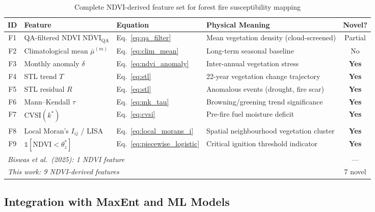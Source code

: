 \documentclass[12pt, a4paper]{article}
\begin{document}
\begin{table}[H]
\centering
\caption{Complete NDVI-derived feature set for forest fire
         susceptibility mapping}
\label{tab:ndvi_features}
\begin{tabular}{@{}clllc@{}}
\toprule
\textbf{ID} & \textbf{Feature} & \textbf{Equation} &
\textbf{Physical Meaning} & \textbf{Novel?} \\
\midrule
F1 & QA-filtered NDVI $\overline{\text{NDVI}}_{\text{QA}}$
   & Eq.~\eqref{eq:qa_filter}
   & Mean vegetation density (cloud-screened)
   & Partial \\
F2 & Climatological mean $\bar{\mu}^{(m)}$
   & Eq.~\eqref{eq:clim_mean}
   & Long-term seasonal baseline
   & No \\
F3 & Monthly anomaly $\delta$
   & Eq.~\eqref{eq:ndvi_anomaly}
   & Inter-annual vegetation stress
   & \textbf{Yes} \\
F4 & STL trend $T$
   & Eq.~\eqref{eq:stl}
   & 22-year vegetation change trajectory
   & \textbf{Yes} \\
F5 & STL residual $R$
   & Eq.~\eqref{eq:stl}
   & Anomalous events (drought, fire scar)
   & \textbf{Yes} \\
F6 & Mann--Kendall $\tau$
   & Eq.~\eqref{eq:mk_tau}
   & Browning/greening trend significance
   & \textbf{Yes} \\
F7 & CVSI$(k^{*})$
   & Eq.~\eqref{eq:cvsi}
   & Pre-fire fuel moisture deficit
   & \textbf{Yes} \\
F8 & Local Moran's $I_{ij}$ / LISA
   & Eq.~\eqref{eq:local_morans_i}
   & Spatial neighbourhood vegetation cluster
   & \textbf{Yes} \\
F9 & $\mathbb{1}[\text{NDVI} < \theta^{*}_{z}]$
   & Eq.~\eqref{eq:piecewise_logistic}
   & Critical ignition threshold indicator
   & \textbf{Yes} \\
\midrule
\multicolumn{4}{l}{\textit{Biswas et al.\ (2025): 1 NDVI feature}} &
    --- \\
\multicolumn{4}{l}{\textit{This work: 9 NDVI-derived features}} &
    7 novel \\
\bottomrule
\end{tabular}
\end{table}

\subsection{Integration with MaxEnt and ML Models}
\label{sec:integration}
\end{document}
